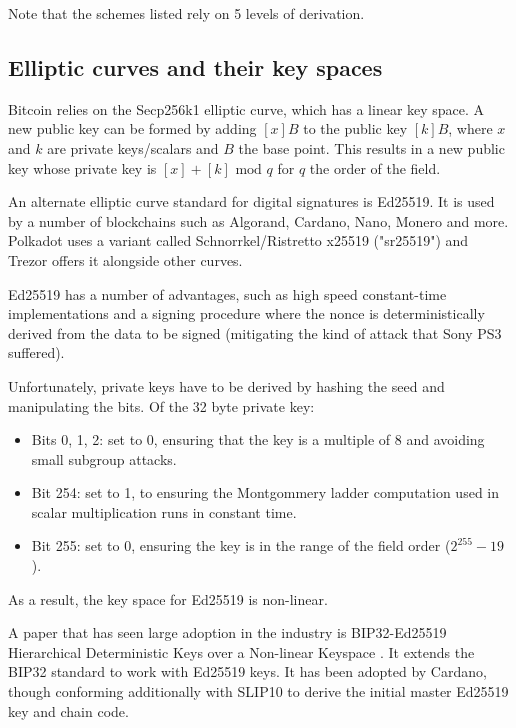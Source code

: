 \documentclass[12pt, a4paper, twocolumn]{article}
\begin{document}
Note that the schemes listed rely on 5 levels of derivation.

\subsection{Elliptic curves and their key spaces}
\label{subsec:elliptic_curves_and_their_key_spaces}

Bitcoin relies on the Secp256k1 elliptic curve, which has a linear key space. A new public key can be formed by adding $[x]B$ to the public key $[k]B$, where $x$ and $k$ are private keys/scalars and $B$ the base point. This results in a new public key whose private key is $[x] + [k] \text{ mod } q$ for $q$ the order of the field.

An alternate elliptic curve standard for digital signatures is Ed25519. It is used by a number of blockchains such as Algorand, Cardano, Nano, Monero and more. Polkadot uses a variant called Schnorrkel/Ristretto x25519 ("sr25519") and Trezor offers it alongside other curves.

Ed25519 has a number of advantages, such as high speed constant-time implementations and a signing procedure where the nonce is deterministically derived from the data to be signed (mitigating the kind of attack that Sony PS3 suffered).

Unfortunately, private keys have to be derived by hashing the seed and manipulating the bits. Of the 32 byte private key:

\begin{itemize}
  \item Bits 0, 1, 2:  set to 0, ensuring that the key is a multiple of 8 and avoiding small subgroup attacks.
  \item Bit 254: set to 1, to ensuring the Montgommery ladder computation used in scalar multiplication runs in constant time.
  \item Bit 255: set to 0, ensuring the key is in the range of the field order ($2^{255} - 19$).
\end{itemize}

As a result, the key space for Ed25519 is non-linear.

A paper that has seen large adoption in the industry is BIP32-Ed25519
Hierarchical Deterministic Keys over a Non-linear Keyspace \cite{BIP32-Ed25519}. It extends the BIP32 standard to work with Ed25519 keys. It has been adopted by Cardano, though conforming additionally with SLIP10 to derive the initial master Ed25519 key and chain code.
\end{document}
